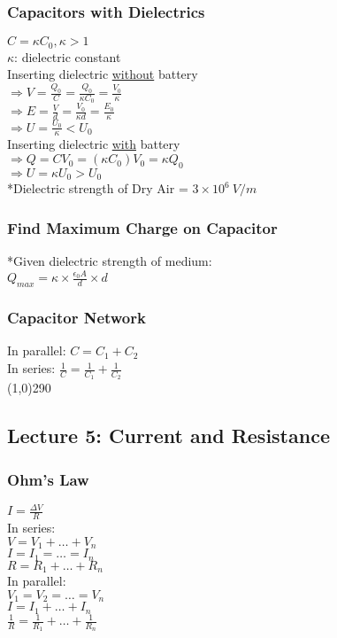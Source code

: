 \documentclass[10 pt]{article}
\begin{document}
\begin{multicols}{2}
\subsubsection*{Capacitors with Dielectrics}
$C = \kappa C_{0}, \kappa > 1$ \\
$\kappa$: dielectric constant \\
\large Inserting dielectric \underline{without} battery \\
$\Rightarrow V = \frac{Q_{0}}{C} = \frac{Q_{0}}{\kappa C_{0}} = \frac{V_{0}}{\kappa}$ \\
$\Rightarrow E = \frac{V}{d} = \frac{V_{0}}{\kappa d} = \frac{E_{0}}{\kappa}$ \\
$\Rightarrow U = \frac{U_{0}}{\kappa} < U_{0}$ \\
\large Inserting dielectric \underline{with} battery \\
$\Rightarrow Q = CV_{0} = (\kappa C_{0})V_{0} = \kappa Q_{0}$ \\
$\Rightarrow U = \kappa U_{0} > U_{0}$ \\
*Dielectric strength of Dry Air = $3 \times 10^{6}~V/m$
\subsubsection*{Find Maximum Charge on Capacitor}
*Given dielectric strength of medium: \\
$Q_{max} = \kappa \times \frac{\epsilon_{0} A}{d} \times d$
\subsubsection*{Capacitor Network}
In parallel: $C = C_{1} + C_{2}$ \\
In series: $\frac{1}{C} = \frac{1}{C_{1}} + \frac{1}{C_{2}}$
\\
\line(1,0){290}
\subsection*{Lecture 5: Current and Resistance}
\subsubsection*{Ohm's Law}
$I = \frac{\Delta V}{R}$ \\
\large In series: \\
$V = V_{1} + \ldots + V_{n}$ \\
$I = I_{1} = \ldots = I_{n}$ \\
$R = R_{1} + \ldots + R_{n}$ \\
\large In parallel: \\
$V_{1} = V_{2} = \ldots = V_{n}$ \\
$I = I_{1} + \ldots + I_{n}$ \\
$\frac{1}{R} = \frac{1}{R_{1}} + \ldots + \frac{1}{R_{n}}$


\end{multicols}
\end{document}
